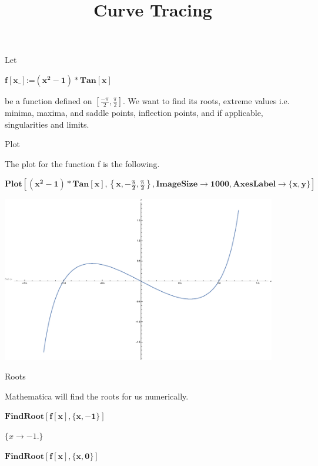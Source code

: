\documentclass{article}
\begin{document}
\title{Curve Tracing}
\author{}
\date{}
\maketitle

Let

\begin{doublespace}
\noindent\(\pmb{f[\text{x$\_$}]\text{:=}\left(x^2-1\right)*\text{Tan}[x]}\)
\end{doublespace}

be a function defined on $\left[\frac{-\pi }{2},\frac{\pi }{2}\right]$. We want to find its roots, extreme values i.e. minima, maxima, and saddle points, inflection points, and if applicable, singularities and limits.

Plot

The plot for the function f is the following.

\begin{doublespace}
\noindent\(\pmb{\text{Plot}\left[\left(x^2-1\right)*\text{Tan}[x],\left\{x,-\frac{\pi }{2},\frac{\pi }{2}\right\},\text{ImageSize}\to 1000,\text{AxesLabel}\to
\{x,y\}\right]}\)
\end{doublespace}

\includegraphics[width=0.9\textwidth]{curve_tracing_09_gr1.eps}

Roots

Mathematica will find the roots for us numerically.

\begin{doublespace}
\noindent\(\pmb{\text{FindRoot}[f[x],\{x,-1\}]}\)
\end{doublespace}

\begin{doublespace}
\noindent\(\{x\to -1.\}\)
\end{doublespace}

\begin{doublespace}
\noindent\(\pmb{\text{FindRoot}[f[x],\{x,0\}]}\)
\end{doublespace}
\end{document}
